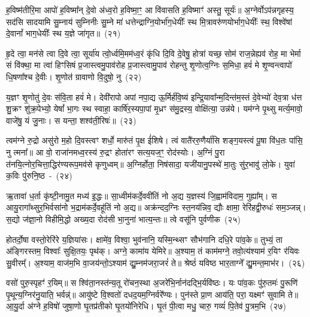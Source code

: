 {\anuvakamend[{अ॒सि॒ षड्विꣳ॑शतिश्च}]}%

ह॒विष्म॑तीरि॒मा आपो॑ ह॒विष्मा᳚न् दे॒वो अ॑ध्व॒रो ह॒विष्मा॒ꣳ॒ आ वि॑वासति ह॒विष्माꣳ॑ अस्तु॒ सूर्यः॑॥ अ॒ग्नेर्वो\-ऽप॑न्नगृहस्य॒ सद॑सि सादयामि सु॒म्नाय॑ सुम्निनीः सु॒म्ने मा॑ धत्तेन्द्राग्नि॒योर्भा॑ग॒धेयीः᳚ स्थ मि॒त्रावरु॑णयोर्भाग॒धेयीः᳚ स्थ॒ विश्वे॑षां दे॒वानां᳚ भाग॒धेयीः᳚ स्थ य॒ज्ञे जा॑गृत॥~(२१)

{\anuvakamend[{ह॒विष्म॑ती॒श्चतु॑स्रिꣳशत्}]}%

हृ॒दे त्वा॒ मन॑से त्वा दि॒वे त्वा॒ सूर्या॑य त्वो॒र्ध्वमि॒मम॑ध्व॒रं कृ॑धि दि॒वि दे॒वेषु॒ होत्रा॑ यच्छ॒ सोम॑ राज॒न्नेह्यव॑ रोह॒ मा भेर्मा सं वि॑क्था॒ मा त्वा॑ हिꣳसिषं प्र॒जास्त्वमु॒पाव॑रोह प्र॒जास्त्वामु॒पाव॑ रोहन्तु शृ॒णोत्व॒ग्निः स॒मिधा॒ हवं॑ मे शृ॒ण्वन्त्वापो॑ धि॒षणा᳚श्च दे॒वीः। शृ॒णोत॑ ग्रावाणो वि॒दुषो॒ नु~(२२)

य॒ज्ञꣳ शृ॒णोतु॑ दे॒वः स॑वि॒ता हवं॑ मे। देवी॑रापो अपां नपा॒द्य ऊ॒र्मिर्\mbox{}ह॑वि॒ष्य॑ इन्द्रि॒यावा᳚न्म॒दिन्त॑म॒स्तं दे॒वेभ्यो॑ देव॒त्रा ध॑त्त शु॒क्रꣳ शु॑क्र॒पेभ्यो॒ येषां᳚ भा॒गः स्थ स्वाहा॒ कार्\mbox{}षि॑र॒स्यपा॒पां मृ॒ध्रꣳ स॑मु॒द्रस्य॒ वोक्षि॑त्या॒ उन्न॑ये। यम॑ग्ने पृ॒थ्सु मर्त्य॒मावो॒ वाजे॑षु॒ यं जु॒नाः। स यन्ता॒ शश्व॑ती॒रिषः॑॥~(२३)

{\anuvakamend[{नु स॒प्तच॑त्वारिꣳशच्च}]}%

त्वम॑ग्ने रु॒द्रो असु॑रो म॒हो दि॒वस्त्वꣳ शर्धो॒ मारु॑तं पृ॒क्ष ई॑शिषे। त्वं वातै॑ररु॒णैर्या॑सि शङ्ग॒यस्त्वं पू॒षा वि॑ध॒तः पा॑सि॒ नु त्मना᳚॥ आ वो॒ राजा॑नमध्व॒रस्य॑ रु॒द्रꣳ होता॑रꣳ सत्य॒यज॒ꣳ॒ रोद॑स्योः। अ॒ग्निं पु॒रा त॑नयि॒त्नोर॒चित्ता॒द्धिर॑ण्यरूप॒मव॑से कृणुध्वम्॥ अ॒ग्निर्\mbox{}होता॒ निष॑सादा॒ यजी॑यानु॒पस्थे॑ मा॒तुः सु॑र॒भावु॑ लो॒के। युवा॑ क॒विः पु॑रुनि॒ष्ठ~-~(२४)

ऋ॒तावा॑ ध॒र्ता कृ॑ष्टी॒नामु॒त मध्य॑ इ॒द्धः॥ सा॒ध्वीम॑कर्दे॒ववी॑तिं नो अ॒द्य य॒ज्ञस्य॑ जि॒ह्वाम॑विदाम॒ गुह्या᳚म्। स आयु॒रागा᳚थ्सुर॒\-भिर्वसा॑नो भ॒द्राम॑कर्दे॒वहू॑तिं नो अ॒द्य॥ अक्र॑न्दद॒ग्निः स्त॒नय॑न्निव॒ द्यौः क्षामा॒ रेरि॑हद्वी॒रुधः॑ सम॒ञ्जन्न्। स॒द्यो ज॑ज्ञा॒नो विहीमि॒द्धो अख्य॒दा रोद॑सी भा॒नुना॑ भात्य॒न्तः॥ त्वे वसू॑नि पुर्वणीक~(२५)

होतर्दो॒षा वस्तो॒रेरि॑रे य॒ज्ञिया॑सः। क्षामे॑व॒ विश्वा॒ भुव॑नानि॒ यस्मि॒न्थ्सꣳ सौभ॑गानि दधि॒रे पा॑व॒के॥ तुभ्यं॒ ता अ॑ङ्गिरस्तम॒ विश्वाः᳚ सुक्षि॒तयः॒ पृथ॑क्। अग्ने॒ कामा॑य येमिरे॥ अ॒श्याम॒ तं काम॑मग्ने॒ तवो॒त्य॑श्याम॑ र॒यिꣳ र॑यिवः सु॒वीरम्᳚। अ॒श्याम॒ वाज॑म॒भि वा॒जय॑न्तो॒\-ऽश्याम॑ द्यु॒म्नम॑जरा॒जरं॑ ते॥ श्रेष्ठं॑ यविष्ठ भार॒ताग्ने᳚ द्यु॒मन्त॒माभ॑र।~(२६)

वसो॑ पुरु॒स्पृहꣳ॑ र॒यिम्॥ स श्वि॑ता॒नस्त॑न्य॒तू रो॑चन॒स्था अ॒जरे॑भि॒र्नान॑दद्भि॒र्यवि॑ष्ठः। यः पा॑व॒कः पु॑रु॒तमः॑ पु॒रूणि॑ पृ॒थून्य॒ग्निर॑नु॒याति॒ भर्वन्न्॑॥ आयु॑ष्टे वि॒श्वतो॑ दधद॒यम॒ग्निर्वरे᳚ण्यः। पुन॑स्ते प्रा॒ण आय॑ति॒ परा॒ यक्ष्मꣳ॑ सुवामि ते॥ आ॒यु॒र्दा अ॑ग्ने ह॒विषो॑ जुषा॒णो घृ॒तप्र॑तीको घृ॒तयो॑निरेधि। घृ॒तं पी॒त्वा मधु॒ चारु॒ गव्यं॑ पि॒तेव॑ पु॒त्रम॒भि~(२७)

